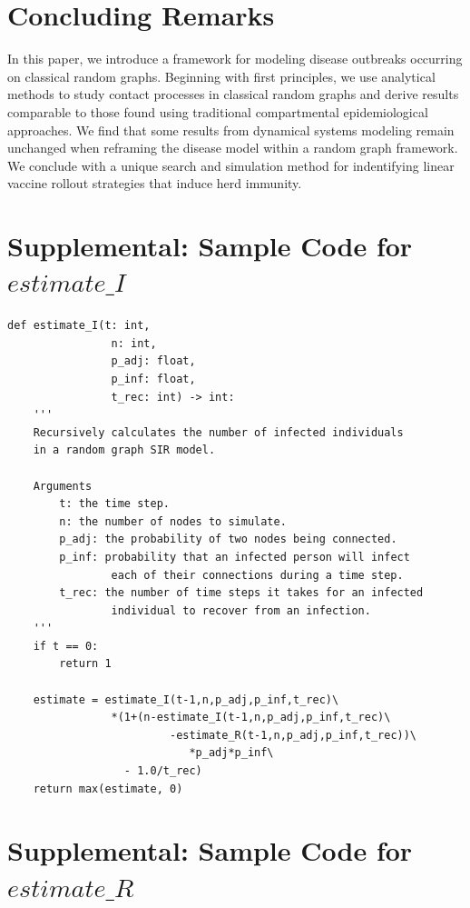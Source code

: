 \documentclass[psamsfonts]{amsart}
\theoremstyle{definition}
\theoremstyle{remark}
\numberwithin{equation}{section}
\begin{document}
\section{Concluding Remarks}

In this paper, we introduce a framework for modeling disease outbreaks occurring on classical random graphs. Beginning with first principles, we use analytical methods to study contact processes in classical random graphs and derive results comparable to those found using traditional compartmental epidemiological approaches. We find that some results from dynamical systems modeling remain unchanged when reframing the disease model within a random graph framework. We conclude with a unique search and simulation method for indentifying linear vaccine rollout strategies that induce herd immunity.





\pagebreak

\section{Supplemental: Sample Code for $estimate\_I$}

\begin{verbatim}
def estimate_I(t: int,
                n: int,
                p_adj: float,
                p_inf: float,
                t_rec: int) -> int:
    '''
    Recursively calculates the number of infected individuals
    in a random graph SIR model.
    
    Arguments
    	t: the time step.
    	n: the number of nodes to simulate.
    	p_adj: the probability of two nodes being connected.
    	p_inf: probability that an infected person will infect
                each of their connections during a time step.
    	t_rec: the number of time steps it takes for an infected
                individual to recover from an infection.
    '''
    if t == 0:
        return 1
    
    estimate = estimate_I(t-1,n,p_adj,p_inf,t_rec)\
                *(1+(n-estimate_I(t-1,n,p_adj,p_inf,t_rec)\
                         -estimate_R(t-1,n,p_adj,p_inf,t_rec))\
                         	*p_adj*p_inf\
                  - 1.0/t_rec)
    return max(estimate, 0)
\end{verbatim}

\pagebreak

\section{Supplemental: Sample Code for $estimate\_R$}
\end{document}
